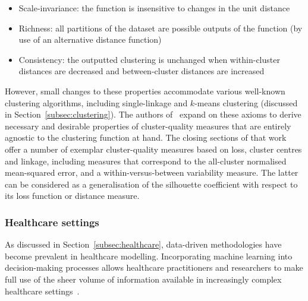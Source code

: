 \begin{itemize}
    \item Scale-invariance: the function is insensitive to changes in the unit
        distance
    \item Richness: all partitions of the dataset are possible outputs of the
        function (by use of an alternative distance function)
    \item Consistency: the outputted clustering is unchanged when within-cluster
        distances are decreased and between-cluster distances are increased
\end{itemize}

However, small changes to these properties accommodate various well-known
clustering algorithms, including single-linkage and \(k\)-means clustering
(discussed in Section~\ref{subsec:clustering}). The authors
of~\cite{BenDavid2008} expand on these axioms to derive necessary and desirable
properties of cluster-quality measures that are entirely agnostic to the
clustering function at hand. The closing sections of that work offer a number of
exemplar cluster-quality measures based on loss, cluster centres and linkage,
including measures that correspond to the all-cluster normalised mean-squared
error, and a within-versus-between variability measure. The latter can be
considered as a generalisation of the silhouette coefficient with respect to its
loss function or distance measure.


\subsubsection{Healthcare settings}

As discussed in Section~\ref{subsec:healthcare}, data-driven methodologies have
become prevalent in healthcare modelling. Incorporating machine learning into
decision-making processes allows healthcare practitioners and researchers to
make full use of the sheer volume of information available in increasingly
complex healthcare
settings~\cite{Alexander2018,Belle2015,Taranu2016,Tomar2013,Tsui2015}.


